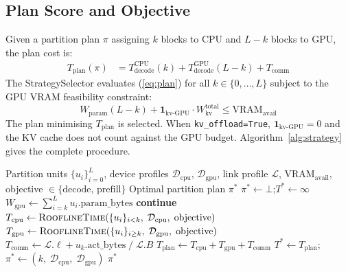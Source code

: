 \documentclass[lettersize,journal]{IEEEtran}
\begin{document}
\subsection{Plan Score and Objective}

Given a partition plan $\pi$ assigning $k$ blocks to CPU and $L-k$ blocks
to GPU, the plan cost is:
\begin{align}
  T_\text{plan}(\pi) &= T^\text{CPU}_\text{decode}(k) + T^\text{GPU}_\text{decode}(L-k)
                       + T_\text{comm} \label{eq:plan}
\end{align}
The StrategySelector evaluates (\ref{eq:plan}) for all $k \in \{0,\ldots,L\}$
subject to the GPU VRAM feasibility constraint:
\begin{equation}
  W_\text{param}(L-k) + \mathbf{1}_\text{kv-GPU} \cdot W_\text{kv}^\text{total}
  \leq \text{VRAM}_\text{avail}
  \label{eq:feasibility}
\end{equation}
The plan minimising $T_\text{plan}$ is selected. When
\texttt{kv\_offload=True}, $\mathbf{1}_\text{kv-GPU} = 0$ and the KV cache
does not count against the GPU budget.
Algorithm~\ref{alg:strategy} gives the complete procedure.

\begin{algorithm}[t]
\caption{StrategySelector: Exhaustive Roofline Partition Search}
\label{alg:strategy}
\begin{algorithmic}[1]
\REQUIRE Partition units $\{u_i\}_{i=0}^{L}$,
         device profiles $\mathcal{D}_\text{cpu}$, $\mathcal{D}_\text{gpu}$,
         link profile $\mathcal{L}$,
         $\mathrm{VRAM}_\text{avail}$,
         objective $\in \{\text{decode},\,\text{prefill}\}$
\ENSURE Optimal partition plan $\pi^{*}$
\STATE $\pi^{*} \leftarrow \bot$;\quad $T^{*} \leftarrow \infty$
  \STATE $W_\text{gpu} \leftarrow \textstyle\sum_{i=k}^{L} u_i.\text{param\_bytes}$
    \STATE \textbf{continue}
  \ENDIF
  \STATE $T_\text{cpu} \leftarrow \textsc{RooflineTime}(\{u_i\}_{i < k},\;\mathcal{D}_\text{cpu},\;\text{objective})$
  \STATE $T_\text{gpu} \leftarrow \textsc{RooflineTime}(\{u_i\}_{i \geq k},\;\mathcal{D}_\text{gpu},\;\text{objective})$
  \STATE $T_\text{comm} \leftarrow \mathcal{L}.\ell + u_k.\text{act\_bytes}\;/\;\mathcal{L}.B$
  \STATE $T_\text{plan} \leftarrow T_\text{cpu} + T_\text{gpu} + T_\text{comm}$
    \STATE $T^{*} \leftarrow T_\text{plan}$;\quad
           $\pi^{*} \leftarrow (k,\;\mathcal{D}_\text{cpu},\;\mathcal{D}_\text{gpu})$
  \ENDIF
\ENDFOR
\RETURN $\pi^{*}$
\end{algorithmic}
\end{algorithm}
\end{document}
